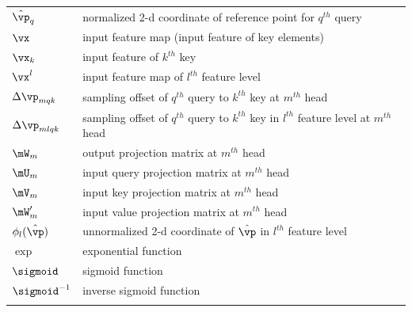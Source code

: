 \begin{table}[ht]
\begin{center}
\begin{tabular}{ll}
$\hat \vp_q$       & normalized 2-d coordinate of reference point for $q^{th}$ query \\
$\vx$              & input feature map (input feature of key elements) \\
$\vx_k$            & input feature of $k^{th}$ key \\
$\vx^l$            & input feature map of $l^{th}$ feature level \\
$\Delta\vp_{mqk}$  & sampling offset of $q^{th}$ query to $k^{th}$ key at $m^{th}$ head \\
$\Delta\vp_{mlqk}$ & sampling offset of $q^{th}$ query to $k^{th}$ key in $l^{th}$ feature level at $m^{th}$ head \\
$\mW_m$            & output projection matrix at $m^{th}$ head \\
$\mU_m$            & input query projection matrix at $m^{th}$ head \\
$\mV_m$            & input key projection matrix at $m^{th}$ head \\
$\mW'_m$           & input value projection matrix at $m^{th}$ head \\
$\phi_l(\hat{\vp})$& unnormalized 2-d coordinate of $\hat{\vp}$ in $l^{th}$ feature level \\
$\exp$             & exponential function \\
$\sigmoid$         & sigmoid function \\
$\sigmoid^{-1}$    & inverse sigmoid function \\
\Xhline{2\arrayrulewidth}
\end{tabular}
\end{center}
\end{table}
